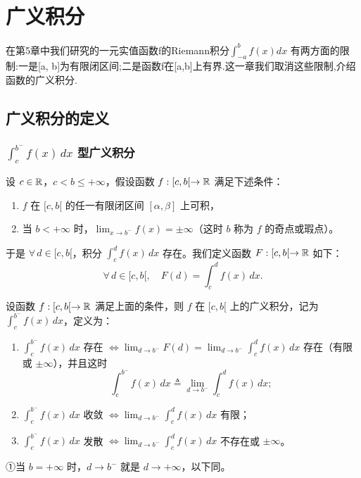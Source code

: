 \chapter{广义积分}

在第5章中我们研究的一元实值函数f的Riemann积分\(\int_{-a}^{b} f(x) dx\) 有两方面的限制:一是{[}a, b{]}为有限闭区间;二是函数f在{[}a,b{]}上有界.这一章我们取消这些限制,介绍函数的广义积分.

\section{广义积分的定义}

\subsection{\texorpdfstring{\(\int_c^{b^-}f(x)\,dx\) 型广义积分}{c 到 b- 型广义积分}}

设 $c\in\mathbb{R}$，$c<b\leqslant+\infty$，假设函数 $f:[c,b[\to\mathbb{R}$ 满足下述条件：

\begin{enumerate}[label=\arabic{enumi})]
\item $f$ 在 $[c,b[$ 的任一有限闭区间 $[\alpha,\beta]$ 上可积，
\item 当 $b<+\infty$ 时，$\displaystyle\lim_{x\to b^-}f(x)=\pm\infty$（这时 $b$ 称为 $f$ 的奇点或瑕点）。
\end{enumerate}

于是 $\forall\,d\in[c,b[$，积分 $\int_c^df(x)\,dx$ 存在。我们定义函数 $F:[c,b[\to\mathbb{R}$ 如下：
\[\forall\,d\in[c,b[,\quad F(d)=\int_c^df(x)\,dx.\]

\begin{mydef*}{}

设函数 $f:[c,b[\to\mathbb{R}$ 满足上面的条件，则 $f$ 在 $[c,b[$ 上的广义积分，记为 $\displaystyle\int_c^{b^-}f(x)\,dx$，定义为：

\begin{enumerate}[label=\arabic{enumi})]
\item $\displaystyle\int_c^{b^-}f(x)\,dx$ 存在 $\Longleftrightarrow\displaystyle\lim_{d\to b^-}F(d)=\lim_{d\to b^-}\int_c^df(x)\,dx$ 存在（有限或 $\pm\infty$），并且这时
\[\int_c^{b^-}f(x)\,dx\triangleq\lim_{d\to b^-}\int_c^df(x)\,dx;\]
\item $\displaystyle\int_c^{b^-}f(x)\,dx$ 收敛 $\Longleftrightarrow\displaystyle\lim_{d\to b^-}\int_c^df(x)\,dx$ 有限；
\item $\displaystyle\int_c^{b^-}f(x)\,dx$ 发散 $\Longleftrightarrow\displaystyle\lim_{d\to b^-}\int_c^df(x)\,dx$ 不存在或 $\pm\infty$。
\end{enumerate}

①当 $b=+\infty$ 时，$d\to b^-$ 就是 $d\to+\infty$，以下同。

\end{mydef*}

